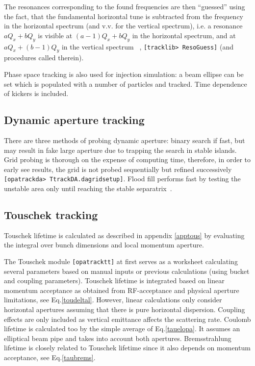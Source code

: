\documentclass[12pt]{article}
\newcommand\code[1]{{\tt [#1]}}
\begin{document}
The resonances corresponding to the found frequencies are then ``guessed'' using the fact, that the fundamental horizontal tune is subtracted from the frequency in the horizontal spectrum (and v.v. for the vertical spectrum), i.e. a resonance $aQ_x+bQ_y$ is visible at $(a-1)Q_x+bQ_y$ in the horizontal spectrum, and at $aQ_x+(b-1)Q_y$ in the vertical spectrum ~\cite{jbthesis}, \code{tracklib> ResoGuess} (and procedures called therein).

Phase space tracking is also used for injection simulation: a beam ellipse can be set which is populated with a number of particles and tracked. Time dependence of kickers is included.


\subsection{Dynamic aperture tracking}
There are three methods of probing dynamic aperture: binary search if fast, but may result in fake large aperture due to trapping the search in stable islands. Grid probing is thorough on the expense of computing time, therefore, in order to early see results, the grid is not probed sequentially but refined successively \code{opatrackda> TtrackDA.dagridsetup}. Flood fill performs fast by testing the unstable area only until reaching the stable separatrix~\cite{FTTpaper}.

\subsection{Touschek tracking}
Touschek lifetime is calculated as described in appendix \ref{apptous} by evaluating the integral over bunch dimensions and local momentum aperture.

The Touschek module \code{opatracktt} at first serves as a worksheet calculating several parameters based on manual inputs or previous calculations (using bucket and coupling parameters). Touschek lifetime is integrated based on linear momentum acceptance as obtained from RF-acceptance and physical aperture limitations, see Eq.\ref{toudeltal}. However, linear calculations only consider horizontal apertures assuming that there is pure horizontal dispersion. Coupling effects are only included as vertical emittance affects the scattering rate.
Coulomb lifetime is calculated too by the simple average of Eq.\ref{tauelopa}. It assumes an elliptical beam pipe and takes into account both apertures. Bremsstrahlung lifetime is closely related to Touschek lifetime since it also depends on momentum acceptance, see Eq.\ref{taubrems}.
\end{document}
